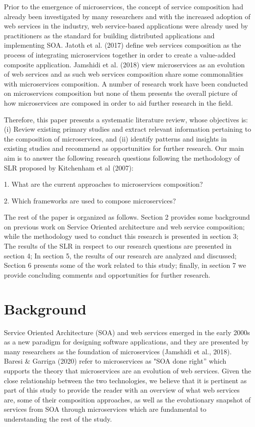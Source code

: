 \documentclass{article}
\begin{document}
\begin{multicols}{2}
Prior to the emergence of microservices, the concept of service composition had already been investigated by many researchers and with the increased adoption of web services in the industry, web service-based applications were already used by practitioners as the standard for building distributed applications and implementing SOA. Jatoth et al. (2017) define web services composition as the process of integrating microservices together in order to create a value-added composite application. Jamshidi et al. (2018) view microservices as an evolution of web services and as such web services composition share some commonalities with microservices composition. A number of research work have been conducted on microservices composition but none of them presents the overall picture of how microservices are composed in order to aid further research in the field. 

Therefore, this paper presents a systematic literature review, whose objectives is: (i) Review existing primary studies and extract relevant information pertaining to the composition of microservices, and (ii) identify patterns and insights in existing studies and recommend as opportunities for further research. Our main aim is to answer the following research questions following the methodology of SLR proposed by Kitchenham et al (2007):

1.	What are the current approaches to microservices composition?

2.	Which frameworks are used to compose microservices?

The rest of the paper is organized as follows. Section 2 provides some background on previous work on Service Oriented architecture and web service composition; while the methodology used to conduct this research is presented in section 3; The results of the SLR in respect to our research questions are presented in section 4; In section 5, the results of our research are analyzed and discussed; Section 6 presents some of the work related to this study; finally, in section 7 we provide concluding comments and opportunities for further research.


\section{Background}
Service Oriented Architecture (SOA) and web services emerged in the early 2000s as a new paradigm for designing software applications, and they are presented by many researchers as the foundation of microservices (Jamshidi et al., 2018). Baresi \& Garriga (2020) refer to microservices as "SOA done right” which supports the theory that microservices are an evolution of web services. Given the close relationship between the two technologies, we believe that it is pertinent as part of this study to provide the reader with an overview of what web services are, some of their composition approaches, as well as the evolutionary snapshot of services from SOA through microservices which are fundamental to understanding the rest of the study.


\end{multicols}
\end{document}

